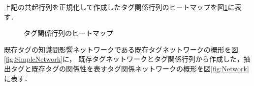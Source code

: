 上記の共起行列を正規化して作成したタグ関係行列のヒートマップを図\ref{fig:Normalized}に表す．

\begin{figure}[H]
\begin{center}
\hspace*{-20pt}
\end{center}
\caption{タグ関係行列のヒートマップ}
\label{fig:Normalized}
\end{figure}

既存タグの知識間影響ネットワークである既存タグネットワークの概形を図\ref{fig:SimpleNetwork}に，
既存タグネットワークとタグ関係行列から作成した，抽出タグと既存タグの関係性を表すタグ関係ネットワークの概形を図\ref{fig:Network}に表す．

